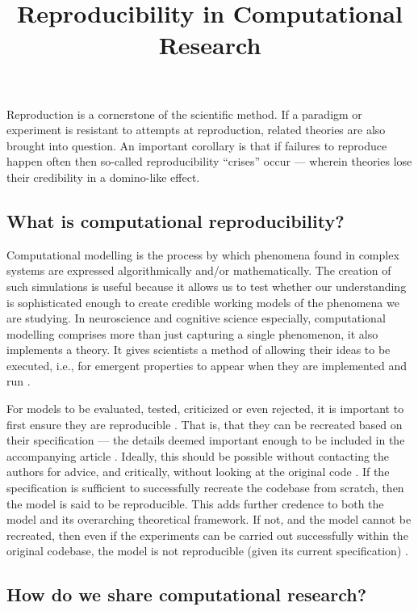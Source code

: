 \documentclass[jou]{apa6}
\title{Reproducibility in Computational Research}
\begin{document}
\maketitle

Reproduction is a cornerstone of the scientific method.
If a paradigm or experiment is resistant to attempts at reproduction, related theories are also brought into question.
An important corollary is that if failures to reproduce happen often then so-called reproducibility ``crises'' occur --- wherein theories lose their credibility in a domino-like effect.

\subsection*{What is computational reproducibility?}

Computational modelling is the process by which phenomena found in complex systems are expressed algorithmically and/or mathematically.
The creation of such simulations is useful because it allows us to test whether our understanding is sophisticated enough to create credible working models of the phenomena we are studying.
In neuroscience and cognitive science especially, computational modelling comprises more than just capturing a single phenomenon, it also  implements a theory.
It gives scientists a method of allowing their ideas to be executed, i.e., for emergent properties to appear when they are implemented and run \cite{mcclelland09}.

For models to be evaluated, tested, criticized or even rejected, it is important to first ensure they are reproducible \cite{topalidou15}.  
That is, that they can be recreated based on their specification --- the details deemed important enough to be included in the accompanying article \cite{hinsen15}.
Ideally, this should be possible without contacting the authors for advice, and critically, without looking at the original code \cite{cooper14}.
If the specification is sufficient to successfully recreate the codebase from scratch, then the model is said to be reproducible.
This adds further credence to both the model and its overarching theoretical framework.
If not, and the model cannot be recreated, then even if the experiments can be carried out successfully within the original codebase, the model is not reproducible (given its current specification) \cite{crook13}.


\subsection*{How do we share computational research?}
\end{document}
